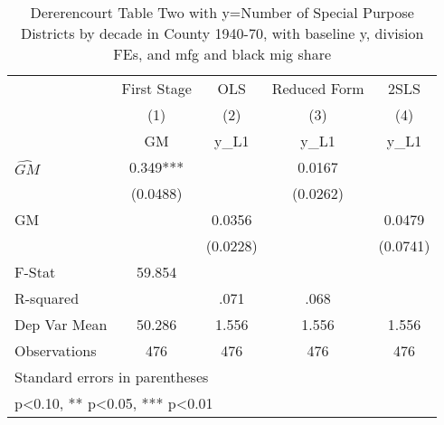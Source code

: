 \begin{table}[htbp]\centering
\def\sym#1{\ifmmode^{#1}\else\(^{#1}\)\fi}
\caption{Dererencourt Table Two with y=Number of Special Purpose Districts by decade in County 1940-70, with baseline y, division FEs, and mfg and black mig share}
\begin{tabular}{l*{4}{c}}
\toprule
                    & First Stage   &         OLS   &Reduced Form   &        2SLS   \\
                    &\multicolumn{1}{c}{(1)}&\multicolumn{1}{c}{(2)}&\multicolumn{1}{c}{(3)}&\multicolumn{1}{c}{(4)}\\
                    &\multicolumn{1}{c}{GM}&\multicolumn{1}{c}{y\_L1}&\multicolumn{1}{c}{y\_L1}&\multicolumn{1}{c}{y\_L1}\\
\midrule
$\hat{GM}$          &       0.349***&               &      0.0167   &               \\
                    &    (0.0488)   &               &    (0.0262)   &               \\
\addlinespace
GM                  &               &      0.0356   &               &      0.0479   \\
                    &               &    (0.0228)   &               &    (0.0741)   \\
\midrule
F-Stat              &      59.854   &               &               &               \\
R-squared           &               &        .071   &        .068   &               \\
Dep Var Mean        &      50.286   &       1.556   &       1.556   &       1.556   \\
Observations        &         476   &         476   &         476   &         476   \\
\bottomrule
\multicolumn{5}{l}{\footnotesize Standard errors in parentheses}\\
\multicolumn{5}{l}{\footnotesize * p<0.10, ** p<0.05, *** p<0.01}\\
\end{tabular}
\end{table}
